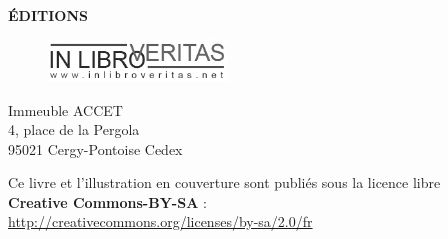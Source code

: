 \thispagestyle{empty}
\null{}
{\centering
	{\bfseries
		{\fontsize{28}{44}\selectfont\MakeTitre{}}\\
		{\fontsize{14}{44}\selectfont\version{}}\par
		{\fontsize{20.74}{22}\selectfont\soustitre}\par
		{\fontsize{12}{36}\selectfont\MakeAuteur}\par
		\begin{figure}[h]%
			\begin{center}%
				\leavevmode%
				\hspace{1cm}%
			\end{center}%
		\end{figure}%
	}\newpage\thispagestyle{empty}
	{\bfseries\fontsize{14}{16}\selectfont{}ÉDITIONS}\par
	\begin{figure}[h]
		\begin{center}
			\includegraphics[width=4.76cm]{framabook/img/ILV_P2.png}
		\end{center}
	\end{figure}
	{\fontsize{14}{16}\selectfont{}Immeuble ACCET\\
														4, place de la Pergola\\
														95021 Cergy-Pontoise Cedex }\par
	{\fontsize{12}{14}\selectfont{}Ce livre et l'illustration en couverture sont publiés sous la licence libre\\\textbf{Creative Commons-BY-SA} :\\\url{http://creativecommons.org/licenses/by-sa/2.0/fr}\par}
}
